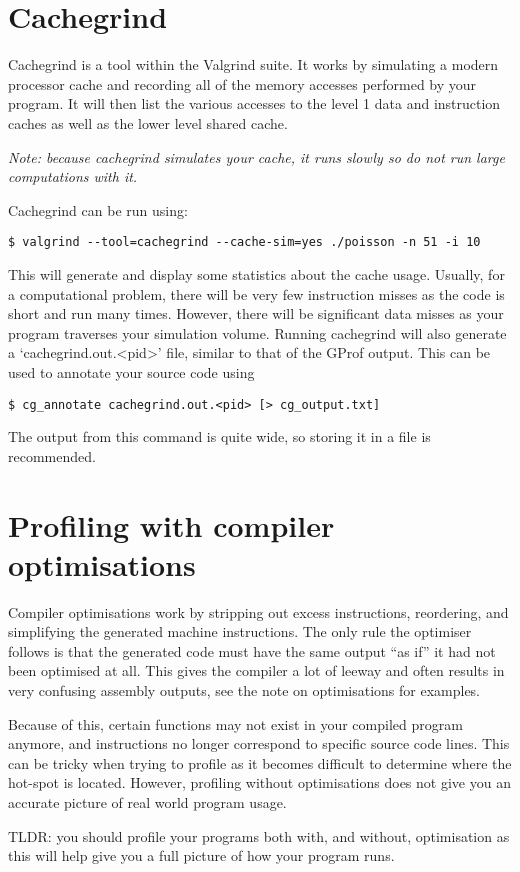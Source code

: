\documentclass[a4paper,11pt]{article}
\begin{document}
\section{Cachegrind}

Cachegrind is a tool within the Valgrind suite. It works by simulating a modern
processor cache and recording all of the memory accesses performed by your
program. It will then list the various accesses to the level 1 data and
instruction caches as well as the lower level shared cache.

\emph{Note: because cachegrind \emph{simulates} your cache, it runs slowly so
do not run large computations with it.}

Cachegrind can be run using:

\begin{verbatim}
$ valgrind --tool=cachegrind --cache-sim=yes ./poisson -n 51 -i 10
\end{verbatim}

This will generate and display some statistics about the cache usage. Usually,
for a computational problem, there will be very few instruction misses as the
code is short and run many times. However, there will be significant data misses
as your program traverses your simulation volume. Running cachegrind will also
generate a `cachegrind.out.<pid>' file, similar to that of the GProf output.
This can be used to annotate your source code using

\begin{verbatim}
$ cg_annotate cachegrind.out.<pid> [> cg_output.txt]
\end{verbatim}

The output from this command is quite wide, so storing it in a file is
recommended.


\section{Profiling with compiler optimisations}

Compiler optimisations work by stripping out excess instructions,
reordering, and simplifying the generated machine instructions. The
only rule the optimiser follows is that the generated code must have
the same output ``as if'' it had not been optimised at all. This gives
the compiler a lot of leeway and often results in very confusing
assembly outputs, see the note on optimisations for examples.

Because of this, certain functions may not exist in your compiled program
anymore, and instructions no longer correspond to specific source code lines.
This can be tricky when trying to profile as it becomes difficult to determine
where the hot-spot is located. However, profiling without optimisations does not
give you an accurate picture of real world program usage.

TLDR: you should profile your programs both with, and without, optimisation
as this will help give you a full picture of how your program runs.
\end{document}
